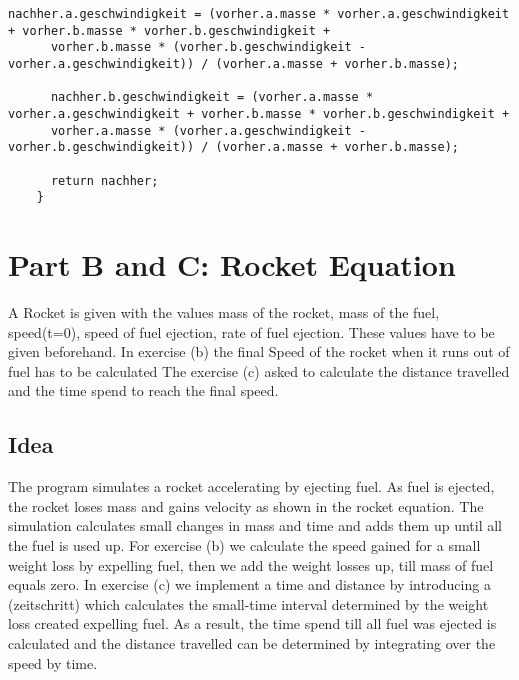\documentclass[12pt,a4paper]{article}
\begin{document}
\begin{lstlisting}[caption={Elastic Collision},label={lst:p7001}]
      nachher.a.geschwindigkeit = (vorher.a.masse * vorher.a.geschwindigkeit + vorher.b.masse * vorher.b.geschwindigkeit + 
      vorher.b.masse * (vorher.b.geschwindigkeit - vorher.a.geschwindigkeit)) / (vorher.a.masse + vorher.b.masse);

      nachher.b.geschwindigkeit = (vorher.a.masse * vorher.a.geschwindigkeit + vorher.b.masse * vorher.b.geschwindigkeit + 
      vorher.a.masse * (vorher.a.geschwindigkeit - vorher.b.geschwindigkeit)) / (vorher.a.masse + vorher.b.masse);
    
      return nachher;
    }   
\end{lstlisting}
    
\vspace{10em}


\section{Part B and C: Rocket Equation}
A Rocket is given with the values mass of the rocket, mass of the fuel, speed(t=0), speed of
fuel ejection, rate of fuel ejection. These values have to be given beforehand.
In exercise (b) the final Speed of the rocket when it runs out of fuel has to be calculated
The exercise (c) asked to calculate the distance travelled and the time spend to reach the final
speed.
\newline

\vspace{1cm}

\subsection{Idea}
The program simulates a rocket accelerating by ejecting fuel. As fuel is ejected, the rocket
loses mass and gains velocity as shown in the rocket equation. The simulation calculates small
changes in mass and time and adds them up until all the fuel is used up. For exercise (b) we
calculate the speed gained for a small weight loss by expelling fuel, then we add the weight
losses up, till mass of fuel equals zero. In exercise (c) we implement a time and distance by
introducing a (zeitschritt) which calculates the small-time interval determined by the weight
loss created expelling fuel. As a result, the time spend till all fuel was ejected is calculated and
the distance travelled can be determined by integrating over the speed by time. 
\newline

\vspace{1cm}
\end{document}
